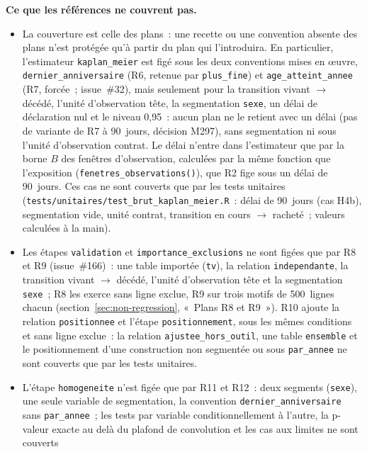 \documentclass[a4paper,11pt]{article}
\newcommand{\code}[1]{\texttt{\small #1}}
\begin{document}
\begin{encadre}
\small
\textbf{Ce que les références ne couvrent pas.}
\begin{itemize}[leftmargin=*, itemsep=1pt, topsep=2pt]
  \item La couverture est celle des plans~: une recette ou une convention
    absente des plans n'est protégée qu'à partir du plan qui l'introduira.
    En particulier, l'estimateur \code{kaplan\_meier} est figé sous les deux
    conventions mises en œuvre, \code{dernier\_anniversaire} (R6, retenue
    par \code{plus\_fine}) et \code{age\_atteint\_annee} (R7, forcée~;
    issue~\#32), mais seulement pour la transition vivant $\to$ décédé,
    l'unité d'observation tête, la segmentation \code{sexe}, un délai de
    déclaration nul et le niveau 0,95~: aucun plan ne le retient avec un
    délai (pas de variante de R7 à 90~jours, décision M297), sans
    segmentation ni sous l'unité d'observation contrat. Le délai
    n'entre dans l'estimateur que par la borne $B$ des fenêtres
    d'observation, calculées par la même fonction que l'exposition
    (\code{fenetres\_observations()}), que R2 fige sous un délai de
    90~jours. Ces cas ne sont couverts que par les tests unitaires
    (\code{tests/unitaires/test\_brut\_kaplan\_meier.R}~: délai de
    90~jours (cas H4b), segmentation vide, unité contrat, transition en
    cours $\to$ racheté~; valeurs calculées à la main).
  \item Les étapes \code{validation} et \code{importance\_exclusions} ne
    sont figées que par R8 et R9 (issue~\#166)~: une table importée
    (\code{tv}), la relation \code{independante}, la transition vivant
    $\to$ décédé, l'unité d'observation tête et la segmentation
    \code{sexe}~; R8 les exerce sans ligne exclue, R9 sur trois motifs de
    500~lignes chacun (section~\ref{sec:non-regression}, «~Plans R8 et
    R9~»). R10 ajoute la relation \code{positionnee} et l'étape
    \code{positionnement}, sous les mêmes conditions et sans ligne exclue~:
    la relation \code{ajustee\_hors\_outil}, une table \code{ensemble} et
    le positionnement d'une construction non segmentée ou sous
    \code{par\_annee} ne sont couverts que par les tests unitaires.
  \item L'étape \code{homogeneite} n'est figée que par R11 et R12~: deux
    segments (\code{sexe}), une seule variable de segmentation, la
    convention \code{dernier\_anniversaire} sans \code{par\_annee}~; les
    tests par variable conditionnellement à l'autre, la p-valeur exacte au
    delà du plafond de convolution et les cas aux limites ne sont couverts

\end{itemize}
\end{encadre}
\end{document}
